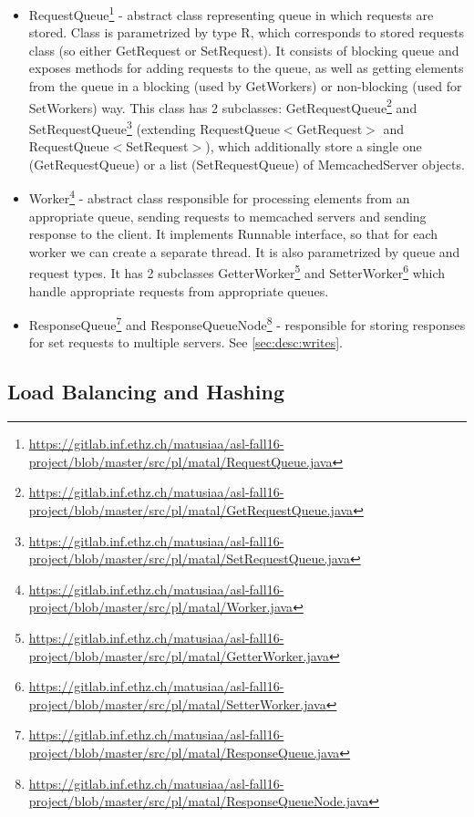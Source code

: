 \documentclass[11pt]{article}
\begin{document}
\begin{itemize}
\item RequestQueue\footnote{\url{https://gitlab.inf.ethz.ch/matusiaa/asl-fall16-project/blob/master/src/pl/matal/RequestQueue.java}} - abstract class representing queue in which requests are stored. Class is parametrized by type R, which corresponds to stored requests class (so either GetRequest or SetRequest). It consists of blocking queue and exposes methods for adding requests to the queue, as well as getting elements from the queue in a blocking (used by GetWorkers) or non-blocking (used for SetWorkers) way. This class has 2 subclasses: GetRequestQueue\footnote{\url{https://gitlab.inf.ethz.ch/matusiaa/asl-fall16-project/blob/master/src/pl/matal/GetRequestQueue.java}} and SetRequestQueue\footnote{\url{https://gitlab.inf.ethz.ch/matusiaa/asl-fall16-project/blob/master/src/pl/matal/SetRequestQueue.java}} (extending RequestQueue$<$GetRequest$>$ and RequestQueue$<$SetRequest$>$), which additionally store a single one (GetRequestQueue) or a list (SetRequestQueue) of MemcachedServer objects.
\item Worker\footnote{\url{https://gitlab.inf.ethz.ch/matusiaa/asl-fall16-project/blob/master/src/pl/matal/Worker.java}} - abstract class responsible for processing elements from an appropriate queue, sending requests to memcached servers and sending response to the client. It implements Runnable interface, so that for each worker we can create a separate thread. It is also parametrized by queue and request types. It has 2 subclasses GetterWorker\footnote{\url{https://gitlab.inf.ethz.ch/matusiaa/asl-fall16-project/blob/master/src/pl/matal/GetterWorker.java}} and SetterWorker\footnote{\url{https://gitlab.inf.ethz.ch/matusiaa/asl-fall16-project/blob/master/src/pl/matal/SetterWorker.java}} which handle appropriate requests from appropriate queues.
\item ResponseQueue\footnote{\url{https://gitlab.inf.ethz.ch/matusiaa/asl-fall16-project/blob/master/src/pl/matal/ResponseQueue.java}} and ResponseQueueNode\footnote{\url{https://gitlab.inf.ethz.ch/matusiaa/asl-fall16-project/blob/master/src/pl/matal/ResponseQueueNode.java}} - responsible for storing responses for set requests to multiple servers. See \ref{sec:desc:writes}. 

\end{itemize} 

\subsection{Load Balancing and Hashing}\label{sec:desc:hashing}
\end{document}

